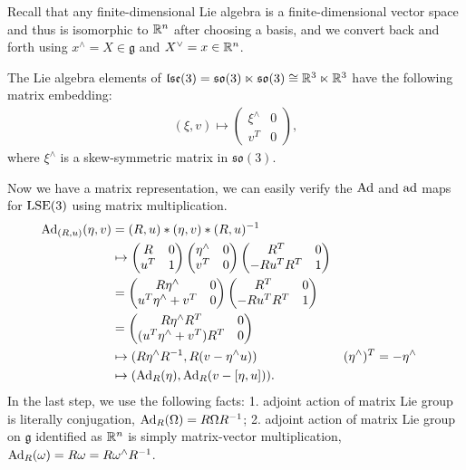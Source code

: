 \documentclass[12pt,class=article,crop=false]{standalone}
\begin{document}
Recall that any finite-dimensional Lie algebra is a finite-dimensional vector space and thus is isomorphic to $ \mathbb{R}^{n}$ after choosing a basis, and we convert back and forth using $ x^\wedge = X \in \mathfrak{g} $ and $ X^\vee = x \in \mathbb{R}^{n}$. 

The Lie algebra elements of $ \mathfrak{lse}(3) = \mathfrak{so}(3) \ltimes \mathfrak{so}(3) \cong \mathbb{R}^3 \ltimes \mathbb{R}^3$ have the following matrix embedding:
\begin{align*}
	(\xi, v) \mapsto \begin{pmatrix} \xi^\wedge & 0\\ v^{T}&0 \end{pmatrix} ,
\end{align*}
where $ \xi^\wedge $ is a skew-symmetric matrix in $ \mathfrak{so}(3) $.

Now we have a matrix representation, we can easily verify the $ \operatorname{Ad}$ and  $ \operatorname{ad}$ maps for $ \operatorname{LSE}(3)$ using matrix multiplication.
\begin{align*}
	\operatorname{Ad}_{ (R,u)}( \eta,v)  &= (R,u) * (\eta,v) * (R,u)^{-1}   \\
			       &\mapsto \begin{pmatrix} R&0\\ u^{T} &1 \end{pmatrix}\begin{pmatrix} \eta^\wedge & 0 \\ v^{T}&0 \end{pmatrix}   \begin{pmatrix} R^{T}& 0\\ - Ru^{T}R^{T} & 1 \end{pmatrix}  \\
			       &= \begin{pmatrix} R \eta^\wedge & 0\\ u^{T} \eta^\wedge + v^{T} & 0 \end{pmatrix} \begin{pmatrix} R^{T}&0\\- Ru^{T}R^{T}&1 \end{pmatrix}  \\
			       &= \begin{pmatrix} R \eta^\wedge R^{T} & 0 \\ (u^{T} \eta^\wedge + v^{T})R^{T}&0\end{pmatrix}  \\
			       &\mapsto  (R \eta^\wedge R^{-1}, R(v - \eta^\wedge u)) && (\eta^\wedge )^{T} = - \eta^\wedge \\
			       &\mapsto  ( \operatorname{Ad}_{ R}( \eta  ), \operatorname{Ad}_{ R}( v - [\eta,u])) .
\end{align*}
In the last step, we use the following facts: 1. adjoint action of matrix Lie group is literally conjugation, $ \operatorname{Ad}_{ R}( \Omega) = R\Omega R^{-1}$;  2. adjoint action of matrix Lie group on $ \mathfrak{g} $ identified as $ \mathbb{R}^{n}$ is simply matrix-vector multiplication, $ \operatorname{Ad}_{ R}( \omega) = R \omega = R \omega^\wedge R^{-1} $.
\end{document}
